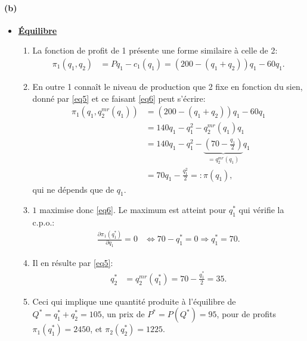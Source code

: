 \begin{frame}[allowframebreaks]{\insertsection}
\framesubtitle{(b)}

    \begin{itemize}
\item \underline{\textbf{ Équilibre}}
        \begin{enumerate}[$\cdot$]
            \item La fonction de profit de 1 présente une forme similaire à celle de 2:
            \begin{align}
                \pi_1\left(q_1, q_2\right) &= Pq_1 - c_1(q_1) = \left(200-(q_1+q_2)\right)q_1 - 60q_1.
                \label{eq6}
            \end{align}
            \item En outre 1 connaît le niveau de production que 2 fixe en fonction du sien, 
            donné par \eqref{eq5} et ce faisant \eqref{eq6} peut s'écrire:
            \begin{align}
                \pi_1\left(q_1, q^{mr}_2(q_1)\right) &= \left(200-(q_1+q_2)\right)q_1 - 60q_1 \nonumber\\
                &= 140q_1 - q_1^2 - q^{mr}_2(q_1)q_1 \nonumber \\
                &= 140q_1 - q_1^2 - \underbrace{\left(70 - \frac{q_1}{2}\right)}_{=q^{mr}_2(q_1)}q_1\nonumber\\
                &= 70q_1 - \frac{q_1^2}{2} =: \pi(q_1),
                \label{eq6}
            \end{align}
            qui ne dépends que de $q_1$. 
            \item $1$ maximise donc \eqref{eq6}. Le maximum est atteint pour $q_1^*$ qui vérifie la c.p.o.:  
            \begin{align}
                \frac{\partial \pi_1(q_1^*)}{\partial q_1} =0 & \Leftrightarrow 
                70 - q_1^* =0 \Rightarrow q_1^* = 70.
                \label{eq7}
            \end{align}
            \item Il en résulte par \eqref{eq5}:
            \begin{align*}
                q^*_2 &= q^{mr}_2(q_1^*) = 70 - \frac{q_1^*}{2}=35.
            \end{align*}
            \item Ceci qui implique une quantité produite à l'équilibre de $Q^* = q_1^* + q_2^* = 105$, 
            un prix de $P^* = P(Q^*) = 95$, pour de profits $\pi_1(q_1^*) = 2450$, et 
            $\pi_2(q_2^*) = 1225$.
        \end{enumerate}
    \end{itemize}
\end{frame}
